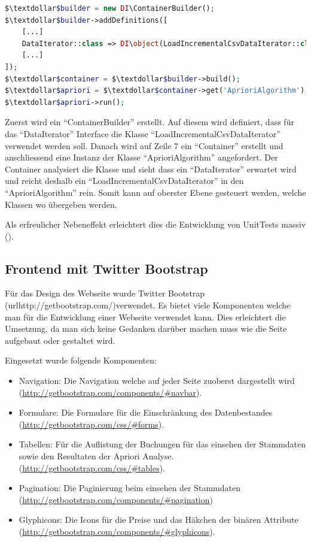 \begin{lstlisting}[language=php]
$\textdollar$builder = new DI\ContainerBuilder();
$\textdollar$builder->addDefinitions([
    [...]
    DataIterator::class => DI\object(LoadIncrementalCsvDataIterator::class),
    [...]
]);
$\textdollar$container = $\textdollar$builder->build();
$\textdollar$apriori = $\textdollar$container->get('AprioriAlgorithm');
$\textdollar$apriori->run();
\end{lstlisting}

Zuerst wird ein "`ContainerBuilder"' erstellt. Auf diesem wird definiert, dass für das "`DataIterator"' Interface die Klasse "`LoadIncrementalCsvDataIterator"' verwendet werden soll. Danach wird auf Zeile 7 ein "`Container"' erstellt und anschliessend eine Instanz der Klasse "`AprioriAlgorithm"' angefordert. Der Container analysiert die Klasse und sieht dass ein "`DataIterator"' erwartet wird und reicht deshalb ein "`LoadIncrementalCsvDataIterator"' in den "`AprioriAlgorithm"' rein. Somit kann auf oberster Ebene gesteuert werden, welche Klassen wo übergeben werden.

Als erfreulicher Nebeneffekt erleichtert dies die Entwicklung von UnitTests massiv ().

\subsection{Frontend mit Twitter Bootstrap}
\label{sec:proofofconcept:externebibliotheken:bootstrap}
Für das Design des Webseite wurde Twitter Bootstrap (url{http://getbootstrap.com/})verwendet. Es bietet viele Komponenten welche man für die Entwicklung einer Webseite verwendet kann. Dies erleichtert die Umsetzung, da man sich keine Gedanken darüber machen muss wie die Seite aufgebaut oder gestaltet wird. 

Eingesetzt wurde folgende Komponenten:
\begin{itemize}
	\item Navigation: Die Navigation welche auf jeder Seite zuoberst dargestellt wird (\url{http://getbootstrap.com/components/#navbar}).
	\item Formulare: Die Formulare für die Einschränkung des Datenbestandes (\url{http://getbootstrap.com/css/#forms}).
	\item Tabellen: Für die Auflistung der Buchungen für das einsehen der Stammdaten sowie den Resultaten der Apriori Analyse. (\url{http://getbootstrap.com/css/#tables}).
	\item Pagination: Die Paginierung beim einsehen der Stammdaten (\url{http://getbootstrap.com/components/#pagination})
	\item Glyphicons: Die Icons für die Preise und das Häkchen der binären Attribute (\url{http://getbootstrap.com/components/#glyphicons}).
\end{itemize}

